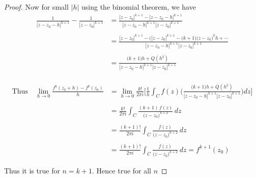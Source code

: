 \documentclass[11pt,a4paper]{article}
\theoremstyle{definition}
\begin{document}
\begin{proof}
Now for small $\left|h\right|$ using the binomial theorem, we have
\begin{align*}
\frac{1}{\big[z - z_0 - h\big]^{k+1}} -\frac{1}{\big[z - z_0\big]^{k+1}} & = \frac{\big[z - z_0\big]^{k+1} - \big[z - z_0 - h\big]^{k+1}}{\big[z - z_0 -h\big]^{k+1}\big[z- z_0\big]^{k+1}}\\\\
& = \frac{\big[z - z_0\big]^{k+1} - \Big(\big[z - z_0\big]^{k+1}- \big(k+1\big)\big(z - z_0\big)^kh + \cdots}{\big[z - z_0 -h\big]^{k+1}\big[z- z_0\big]^{k+1}}\\\\
& = \frac{\big(k+1\big)h + Q(h^2)}{\big[z - z_0 -h\big]^{k+1}\big[z- z_0\big]^{k+1}}\\
\end{align*}


\begin{align*}
\text{Thus}\quad  \lim\limits_{h\rightarrow 0 } \frac{f^k(z_0 + h) - f^k(z_0)}{h} & = \lim\limits_{h\rightarrow 0}\frac{k!}{2\pi i}\Bigg[\frac{1}{h}\int_C f(z)\Bigg( \frac{\big(k+1\big)h + Q(h^2)}{\big[z - z_0 -h\big]^{k+1}\big[z- z_0\big]^{k+1}}\Bigg)dz\Bigg]\\\\
& = \frac{k!}{2\pi i}\int_C\frac{(k+1)\,f(z)}{\big(z - z_0\big)^{k + 2}}\,dz\\\\
& = \frac{(k+1)!}{2\pi i}\int_C\frac{f(z)}{\big(z - z_0\big)^{k+2}}\,dz\\\\
& = \frac{(k+1)!}{2\pi i}\int_C \frac{f(z)}{\big(z - z_0\big)^{k+2}}\,dz = f^{k+1}(z_0)
\end{align*}

Thus it is true for $n = k+ 1$. Hence true for all $n$
\end{proof}
\end{document}
